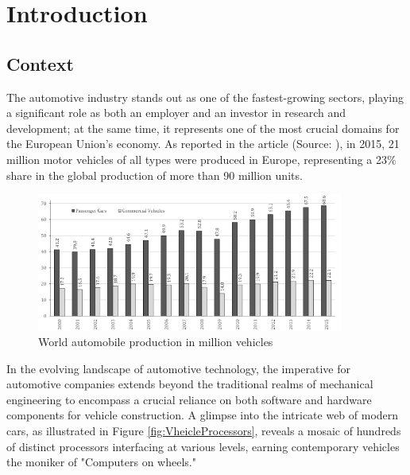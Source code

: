 \hypersetup{
    colorlinks=true,
    linkcolor=blue
}

\chapter{Introduction} \label{ch:introduction}

\section{Context}
The automotive industry stands out as one of the fastest-growing sectors, playing a significant role as both an employer and an investor in research and development; at the same time, it represents one of the most crucial domains for the European Union's economy. As reported in the article (Source: \cite{automotiveInCentralEurope}), in 2015, 21 million motor vehicles of all types were produced in Europe, representing a 23\% share in the global production of more than 90 million units.

\begin{figure}[h]  %
  \centering
  \includegraphics[width=0.9\textwidth]{images/automotive_world production.png}  %
  \caption{World automobile production in million vehicles \cite{automotiveInCentralEurope}}
  \label{fig:WorldAutomobileProduction}
\end{figure}

In the evolving landscape of automotive technology, the imperative for automotive companies extends beyond the traditional realms of mechanical engineering to encompass a crucial reliance on both software and hardware components for vehicle construction. A glimpse into the intricate web of modern cars, as illustrated in Figure \ref{fig:VheicleProcessors}, reveals a mosaic of hundreds of distinct processors interfacing at various levels, earning contemporary vehicles the moniker of "Computers on wheels."

